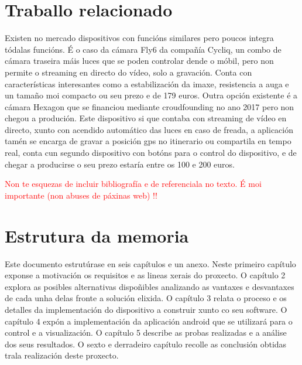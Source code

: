 \section{Traballo relacionado}
Existen no mercado dispositivos con funcións similares pero poucos integra tódalas funcións. É o caso da cámara Fly6 da compañía Cycliq, un combo de cámara traseira máis luces que se poden controlar dende o móbil, pero non permite o streaming en directo do vídeo, solo a gravación. Conta con características interesantes como a estabilización da imaxe, resistencia a auga e un tamaño moi compacto ou seu prezo e de 179 euros. Outra opción existente é a cámara Hexagon que se financiou mediante croudfounding no ano 2017 pero non chegou a produción. Este dispositivo si que contaba con streaming de vídeo en directo, xunto con acendido automático das luces en caso de freada, a aplicación tamén se encarga de gravar a posición gps no itinerario ou compartila en tempo real, conta cun segundo dispositivo con botóns para o control do dispositivo, e de chegar a producirse o seu prezo estaría entre os 100 e 200 euros.

\textcolor{red}{Non te esquezas de incluir bibliografía e de referenciala no texto. É moi importante (non abuses de páxinas web) !!}

\section{Estrutura da memoria}
Este documento estrutúrase en seis capítulos e un anexo. Neste primeiro capítulo exponse a motivación os requisitos e as lineas xerais do proxecto. O capítulo 2 explora as posibles alternativas dispoñibles analizando as vantaxes e desvantaxes de cada unha delas fronte a solución elixida. O capítulo 3 relata o proceso e os detalles da implementación do dispositivo a construir xunto co seu software. O capítulo 4 expón a implementación da aplicación android que se utilizará para o control e a visualización. O capítulo 5 describe as probas realizadas e a análise dos seus resultados. O sexto e derradeiro capítulo recolle as conclusión obtidas trala realización deste proxecto.
